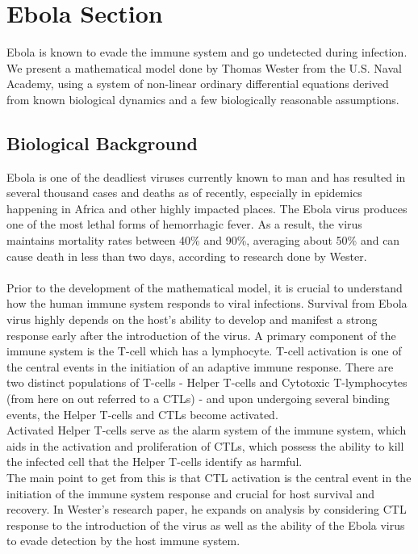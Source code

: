 \documentclass{article}
\begin{document}
\section{Ebola Section}
Ebola is known to evade the immune system and go undetected during infection. We present a mathematical model done by Thomas Wester from the U.S. Naval Academy, using a system of non-linear ordinary differential equations derived from known biological dynamics and a few biologically reasonable assumptions.

\subsection{Biological Background}
Ebola is one of the deadliest viruses currently known to man and has resulted in several thousand cases and deaths as of recently, especially in epidemics happening in Africa and other highly impacted places. The Ebola virus produces one of the most lethal forms of hemorrhagic fever. As a result, the virus maintains mortality rates between 40\% and 90\%, averaging about 50\% and can cause death in less than two days, according to research done by Wester.\\
\\
Prior to the development of the mathematical model, it is crucial to understand how the human immune system responds to viral infections. Survival from Ebola virus highly depends on the host's ability to develop and manifest a strong response early after the introduction of the virus. A primary component of the immune system is the T-cell which has a lymphocyte. T-cell activation is one of the central events in the initiation of an adaptive immune response. There are two distinct populations of T-cells - Helper T-cells and Cytotoxic T-lymphocytes (from here on out referred to a CTLs) - and upon undergoing several binding events, the Helper T-cells and CTLs become activated.\\
Activated Helper T-cells serve as the alarm system of the immune system, which aids in the activation and proliferation of CTLs, which possess the ability to kill the infected cell that the Helper T-cells identify as harmful.\\
The main point to get from this is that CTL activation is the central event in the initiation of the immune system response and crucial for host survival and recovery. In Wester's research paper, he expands on analysis by considering CTL response to the introduction of the virus as well as the ability of the Ebola virus to evade detection by the host immune system.
\end{document}
